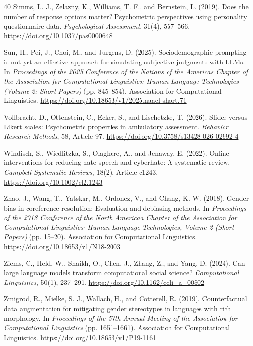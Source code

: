 \documentclass[a4paper,fleqn,review]{cas-sc}
\begin{document}
\begin{thebibliography}{40}
Simms, L. J., Zelazny, K., Williams, T. F., and Bernstein, L. (2019).
Does the number of response options matter? Psychometric perspectives using personality questionnaire data.
\emph{Psychological Assessment}, 31(4), 557--566.
\url{https://doi.org/10.1037/pas0000648}

Sun, H., Pei, J., Choi, M., and Jurgens, D. (2025).
Sociodemographic prompting is not yet an effective approach for simulating subjective judgments with LLMs.
In \emph{Proceedings of the 2025 Conference of the Nations of the Americas Chapter of the Association for Computational Linguistics: Human Language Technologies (Volume 2: Short Papers)} (pp. 845--854).
Association for Computational Linguistics.
\url{https://doi.org/10.18653/v1/2025.naacl-short.71}

Vollbracht, D., Ottenstein, C., Ecker, S., and Lischetzke, T. (2026).
Slider versus Likert scales: Psychometric properties in ambulatory assessment.
\emph{Behavior Research Methods}, 58, Article 97.
\url{https://doi.org/10.3758/s13428-026-02992-4}

Windisch, S., Wiedlitzka, S., Olaghere, A., and Jenaway, E. (2022).
Online interventions for reducing hate speech and cyberhate: A systematic review.
\emph{Campbell Systematic Reviews}, 18(2), Article e1243.
\url{https://doi.org/10.1002/cl2.1243}

Zhao, J., Wang, T., Yatskar, M., Ordonez, V., and Chang, K.-W. (2018).
Gender bias in coreference resolution: Evaluation and debiasing methods.
In \emph{Proceedings of the 2018 Conference of the North American Chapter of the Association for Computational Linguistics: Human Language Technologies, Volume 2 (Short Papers)} (pp. 15--20).
Association for Computational Linguistics.
\url{https://doi.org/10.18653/v1/N18-2003}

Ziems, C., Held, W., Shaikh, O., Chen, J., Zhang, Z., and Yang, D. (2024).
Can large language models transform computational social science?
\emph{Computational Linguistics}, 50(1), 237--291.
\url{https://doi.org/10.1162/coli_a_00502}

Zmigrod, R., Mielke, S. J., Wallach, H., and Cotterell, R. (2019).
Counterfactual data augmentation for mitigating gender stereotypes in languages with rich morphology.
In \emph{Proceedings of the 57th Annual Meeting of the Association for Computational Linguistics} (pp. 1651--1661).
Association for Computational Linguistics.
\url{https://doi.org/10.18653/v1/P19-1161}

\end{thebibliography}
\end{document}
